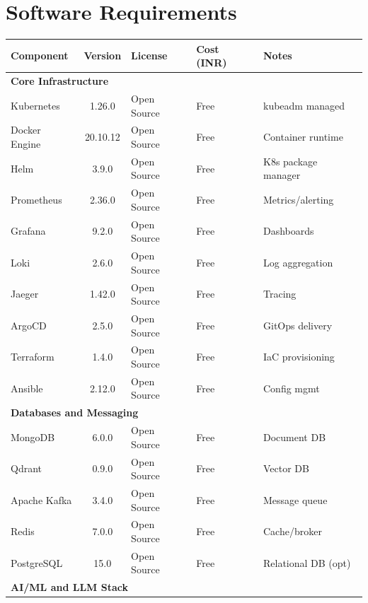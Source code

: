 \documentclass[12pt]{report}
\begin{document}
\section{Software Requirements}
\begin{table}[H]
  \centering
  \footnotesize
  \setlength{\tabcolsep}{2pt} %
  \begin{tabular}{@{} l c l l l @{}}
    \toprule
    \textbf{Component} & \textbf{Version} & \textbf{License} & \textbf{Cost (INR)} & \textbf{Notes} \\
    \midrule
    \multicolumn{5}{l}{\textbf{Core Infrastructure}} \\
    Kubernetes              & 1.26.0 & Open Source & Free & kubeadm managed \\
    Docker Engine           & 20.10.12 & Open Source & Free & Container runtime \\
    Helm                    & 3.9.0 & Open Source & Free & K8s package manager \\
    Prometheus              & 2.36.0 & Open Source & Free & Metrics/alerting \\
    Grafana                 & 9.2.0 & Open Source & Free & Dashboards \\
    Loki                    & 2.6.0 & Open Source & Free & Log aggregation \\
    Jaeger                  & 1.42.0 & Open Source & Free & Tracing \\
    ArgoCD                  & 2.5.0 & Open Source & Free & GitOps delivery \\
    Terraform               & 1.4.0 & Open Source & Free & IaC provisioning \\
    Ansible                 & 2.12.0 & Open Source & Free & Config mgmt \\
    \midrule
    \multicolumn{5}{l}{\textbf{Databases and Messaging}} \\
    MongoDB                 & 6.0.0 & Open Source & Free & Document DB \\
    Qdrant                  & 0.9.0 & Open Source & Free & Vector DB \\
    Apache Kafka            & 3.4.0 & Open Source & Free & Message queue \\
    Redis                   & 7.0.0 & Open Source & Free & Cache/broker \\
    PostgreSQL              & 15.0 & Open Source & Free & Relational DB (opt) \\
    \midrule
    \multicolumn{5}{l}{\textbf{AI/ML and LLM Stack}} \\

\end{tabular}
\end{table}
\end{document}

